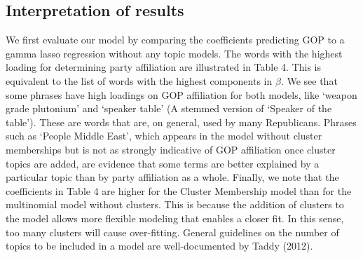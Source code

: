 \documentclass[12pt]{article}
\begin{document}
\subsection{Interpretation of results}

We first evaluate our model by comparing the coefficients predicting GOP to a gamma lasso regression without any topic models. 
The words with the highest loading for determining party affiliation are illustrated in Table 4. This is equivalent to the list of words with the highest components in $\beta$.
We see that some phrases have high loadings on GOP affiliation for both models, like `weapon grade plutonium' and `speaker table' (A stemmed version of `Speaker of the table'). These are words that are, on general, used by many Republicans. 
Phrases such as `People Middle East', which appears in the model without cluster memberships but is not as strongly indicative of GOP affiliation once cluster topics are added, are evidence that some terms are better explained by a particular topic than by party affiliation as a whole. 
Finally, we note that the coefficients in Table 4 are higher for the Cluster Membership model than for the multinomial model without clusters. This is because the addition of clusters to the model allows more flexible modeling that enables a closer fit. In this sense, too many clusters will cause over-fitting. General guidelines on the number of topics to be included in a model are well-documented by Taddy (2012).
\end{document}
